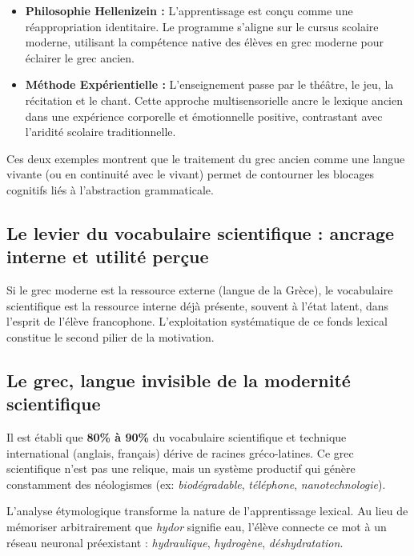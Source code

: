 \begin{itemize}\item \textbf{Philosophie \og Hellenizein\fg{} :} L'apprentissage est conçu comme une réappropriation identitaire. Le programme s'aligne sur le cursus scolaire moderne, utilisant la compétence native des élèves en grec moderne pour éclairer le grec ancien.\cite{ref42}\item \textbf{Méthode Expérientielle :} L'enseignement passe par le théâtre, le jeu, la récitation et le chant. Cette approche multisensorielle ancre le lexique ancien dans une expérience corporelle et émotionnelle positive, contrastant avec l'aridité scolaire traditionnelle.\cite{ref42}\end{itemize}Ces deux exemples montrent que le traitement du grec ancien comme une langue \og vivante\fg{} (ou en
continuité avec le vivant) permet de contourner les blocages cognitifs liés à l'abstraction
grammaticale.



\subsection{Le levier du vocabulaire scientifique : ancrage interne et utilité perçue}

Si le grec moderne est la ressource \og externe\fg{} (langue de la Grèce), le vocabulaire
scientifique est la ressource \og interne\fg{} déjà présente, souvent à l'état latent, dans l'esprit
de l'élève francophone. L'exploitation systématique de ce fonds lexical constitue le second pilier
de la motivation.



\subsection{Le grec, langue invisible de la modernité scientifique}

Il est établi que \textbf{80\% à 90\%} du vocabulaire scientifique et technique international
(anglais, français) dérive de racines gréco-latines.\cite{ref45} Ce \og grec scientifique\fg{} n'est
pas une relique, mais un système productif qui génère constamment des néologismes (ex:
\textit{biodégradable}, \textit{téléphone}, \textit{nanotechnologie}).

L'analyse étymologique transforme la nature de l'apprentissage lexical. Au lieu de mémoriser
arbitrairement que \textit{hydor} signifie \og eau\fg{}, l'élève connecte ce mot à un réseau
neuronal préexistant : \textit{hydraulique}, \textit{hydrogène},
\textit{déshydratation}.\cite{ref48}

